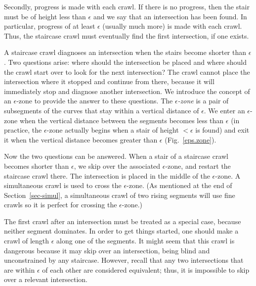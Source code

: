 Secondly, progress is made with each crawl. 
If there is no progress, then the stair must
be of height less than $\epsilon$ and we say that an intersection has been found.
In particular, progress of at least $\epsilon$ (usually much more) is made with each crawl.
Thus, the staircase crawl must eventually find the first intersection, if one exists.
\QED

A staircase crawl diagnoses an intersection when the stairs become shorter than $\epsilon$.
Two questions arise: where should the intersection be placed  and
where should the crawl start over to look for the next intersection?
The crawl cannot place the intersection where it stopped and continue
from there, because it will immediately stop and diagnose another intersection.
We introduce the concept of an $\epsilon$-zone to provide the answer to these questions.
The {\em $\epsilon$-zone} is a pair of subsegments of the curves that stay within a 
vertical distance of $\epsilon$.
We enter an $\epsilon$-zone when the vertical distance between the segments becomes
less than $\epsilon$ (in practice, the $\epsilon$-zone actually begins when a 
	stair of height $< \epsilon$ is found)
and exit it when the vertical distance becomes greater than $\epsilon$
(Fig.~\ref{eps.zone}).


Now the two questions can be answered.
When a stair of a staircase crawl becomes shorter than $\epsilon$, we 
skip over the associated $\epsilon$-zone, and restart the staircase crawl there.
The intersection is placed in the middle of the $\epsilon$-zone.
A simultaneous crawl is used to cross the $\epsilon$-zone.
(As mentioned at the end of Section~\ref{sec-simul}, a simultaneous crawl of two rising 
segments will use fine crawls so it is perfect for crossing the $\epsilon$-zone.)

The first crawl after an intersection must be treated as a special case, because neither 
segment dominates.
In order to get things started, one should make a crawl of length $\epsilon$ 
along one of the segments.
It might seem that this crawl is dangerous because it may skip over an intersection,
being blind and unconstrained by any staircase.
However, recall that any two intersections that are within $\epsilon$ of each other
are considered equivalent;  thus, it is impossible to skip over a relevant intersection.

